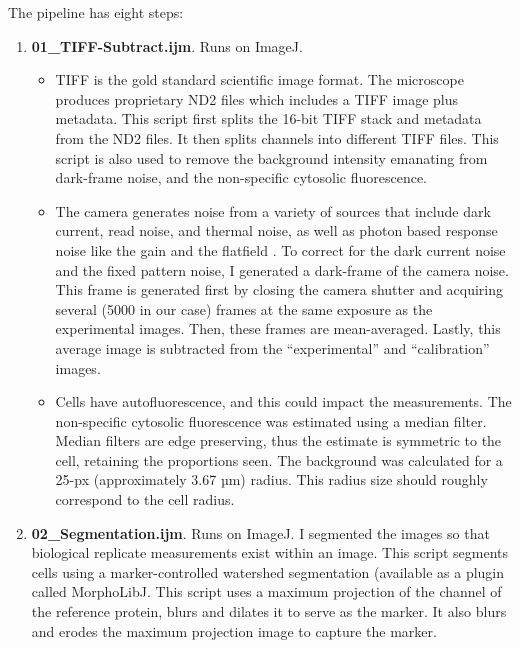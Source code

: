 The pipeline has eight steps:
\begin{enumerate}

\item \textbf{01\_TIFF-Subtract.ijm}. Runs on ImageJ.

\begin{itemize}

\item TIFF is the gold standard scientific image format. The microscope produces proprietary ND2 files which includes a TIFF image plus metadata. This script first splits the 16-bit TIFF stack and metadata from the ND2 files. It then splits channels into different TIFF files. This script is also used to remove the background intensity emanating from dark-frame noise, and the non-specific cytosolic fluorescence. 

\item The camera generates noise from a variety of sources that include dark current, read noise, and thermal noise, as well as photon based response noise like the gain and the flatfield \autocite{Diekmann_2022}. To correct for the dark current noise and the fixed pattern noise, I generated a dark-frame of the camera noise. This frame is generated first by closing the camera shutter and acquiring several (5000 in our case) frames at the same exposure as the experimental images. Then, these frames are mean-averaged. Lastly, this average image is subtracted from the “experimental” and “calibration” images.

\item Cells have autofluorescence, and this could impact the measurements. The non-specific cytosolic fluorescence was estimated using a median filter. Median filters are edge preserving, thus the estimate is symmetric to the cell, retaining the proportions seen. The background was calculated for a 25-px (approximately 3.67 µm) radius. This radius size should roughly correspond to the cell radius.

\end{itemize}

\item \textbf{02\_Segmentation.ijm}. Runs on ImageJ. I segmented the images so that biological replicate measurements exist within an image. This script segments cells using a marker-controlled watershed segmentation (available as a plugin called MorphoLibJ\autocite{Legland_2016}. This script uses a maximum projection of the channel of the reference protein, blurs and dilates it to serve as the marker. It also blurs and erodes the maximum projection image to capture the marker.


\end{enumerate}
